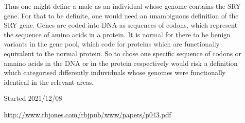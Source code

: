 \documentclass[10pt,titlepage]{article}
\begin{document}
Thus one might define a male as an individual whose genome contains the SRY gene.
For that to be definite, one would need an unambiguous definition of the SRY gene.
Genes are coded into DNA as sequences of codons, which represent the sequence of amino acids in a protein.
It is normal for there to be benign variants in the gene pool, which code for proteins which are functionally equivalent to the normal protein.
So to chose one specific sequence of codons or amnino acids in the DNA or in the protein respectively would risk a definition which categorised differently induviduals whose genomes were functionally identical in the relevant areas.




{}





\tiny{
Started 2021/12/08


\href{http://www.rbjones.com/rbjpub/www/papers/p043.pdf}{http://www.rbjones.com/rbjpub/www/papers/p043.pdf}

}%
\end{document}
